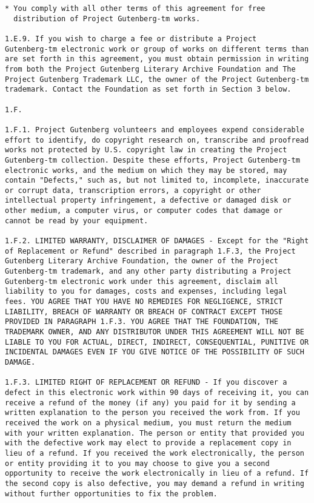 \documentclass[oneside]{book}
\begin{document}
\begin{verbatim}
* You comply with all other terms of this agreement for free
  distribution of Project Gutenberg-tm works.

1.E.9. If you wish to charge a fee or distribute a Project
Gutenberg-tm electronic work or group of works on different terms than
are set forth in this agreement, you must obtain permission in writing
from both the Project Gutenberg Literary Archive Foundation and The
Project Gutenberg Trademark LLC, the owner of the Project Gutenberg-tm
trademark. Contact the Foundation as set forth in Section 3 below.

1.F.

1.F.1. Project Gutenberg volunteers and employees expend considerable
effort to identify, do copyright research on, transcribe and proofread
works not protected by U.S. copyright law in creating the Project
Gutenberg-tm collection. Despite these efforts, Project Gutenberg-tm
electronic works, and the medium on which they may be stored, may
contain "Defects," such as, but not limited to, incomplete, inaccurate
or corrupt data, transcription errors, a copyright or other
intellectual property infringement, a defective or damaged disk or
other medium, a computer virus, or computer codes that damage or
cannot be read by your equipment.

1.F.2. LIMITED WARRANTY, DISCLAIMER OF DAMAGES - Except for the "Right
of Replacement or Refund" described in paragraph 1.F.3, the Project
Gutenberg Literary Archive Foundation, the owner of the Project
Gutenberg-tm trademark, and any other party distributing a Project
Gutenberg-tm electronic work under this agreement, disclaim all
liability to you for damages, costs and expenses, including legal
fees. YOU AGREE THAT YOU HAVE NO REMEDIES FOR NEGLIGENCE, STRICT
LIABILITY, BREACH OF WARRANTY OR BREACH OF CONTRACT EXCEPT THOSE
PROVIDED IN PARAGRAPH 1.F.3. YOU AGREE THAT THE FOUNDATION, THE
TRADEMARK OWNER, AND ANY DISTRIBUTOR UNDER THIS AGREEMENT WILL NOT BE
LIABLE TO YOU FOR ACTUAL, DIRECT, INDIRECT, CONSEQUENTIAL, PUNITIVE OR
INCIDENTAL DAMAGES EVEN IF YOU GIVE NOTICE OF THE POSSIBILITY OF SUCH
DAMAGE.

1.F.3. LIMITED RIGHT OF REPLACEMENT OR REFUND - If you discover a
defect in this electronic work within 90 days of receiving it, you can
receive a refund of the money (if any) you paid for it by sending a
written explanation to the person you received the work from. If you
received the work on a physical medium, you must return the medium
with your written explanation. The person or entity that provided you
with the defective work may elect to provide a replacement copy in
lieu of a refund. If you received the work electronically, the person
or entity providing it to you may choose to give you a second
opportunity to receive the work electronically in lieu of a refund. If
the second copy is also defective, you may demand a refund in writing
without further opportunities to fix the problem.


\end{verbatim}
\end{document}
